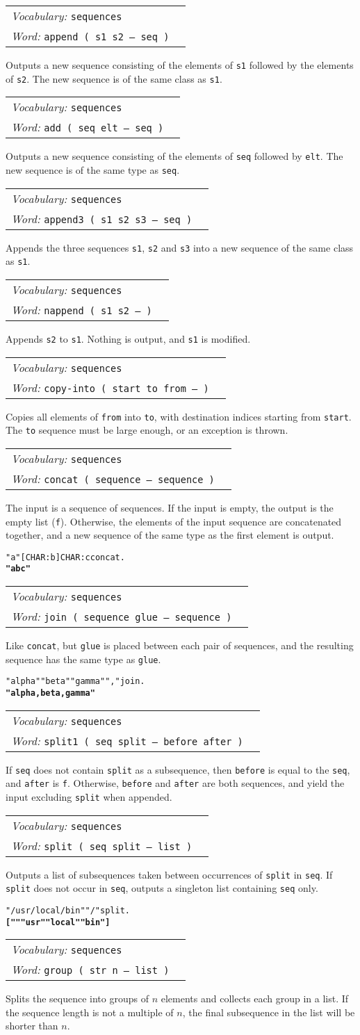 \documentclass{book}
\newcommand{\tto}{\symbol{123}}
\newcommand{\ttc}{\symbol{125}}
\newcommand{\vocabulary}[1]{\emph{Vocabulary:} \texttt{#1}&\\}
\newcommand{\ordinaryword}[2]{\index{\texttt{#1}}\emph{Word:} \texttt{#2}&\\}
\newcommand{\wordtable}[1]{


\begin{tabularx}{12cm}{lX}
\hline
#1
\hline
\end{tabularx}

}
\begin{document}
\wordtable{
\vocabulary{sequences}
\ordinaryword{append}{append ( s1 s2 -- seq )}
}
Outputs a new sequence consisting of the elements of \texttt{s1} followed by the elements of \texttt{s2}. The new sequence is of the same class as \texttt{s1}.
\wordtable{
\vocabulary{sequences}
\ordinaryword{add}{add ( seq elt -- seq )}
}
Outputs a new sequence consisting of the elements of \texttt{seq} followed by \verb|elt|.
The new sequence is of the same type as \texttt{seq}.
\wordtable{
\vocabulary{sequences}
\ordinaryword{append3}{append3 ( s1 s2 s3 -- seq )}
}
Appends the three sequences \texttt{s1}, \texttt{s2} and \texttt{s3} into a new sequence of the same class as \texttt{s1}.

\wordtable{
\vocabulary{sequences}
\ordinaryword{nappend}{nappend ( s1 s2 -- )}
}
Appends \texttt{s2} to \texttt{s1}. Nothing is output, and \texttt{s1} is modified.

\wordtable{
\vocabulary{sequences}
\ordinaryword{copy-into}{copy-into ( start to from -- )}
}
Copies all elements of \verb|from| into \verb|to|, with destination indices starting from \verb|start|. The \verb|to| sequence must be large enough, or an exception is thrown.

\wordtable{
\vocabulary{sequences}
\ordinaryword{concat}{concat ( sequence -- sequence )}
}
The input is a sequence of sequences. If the input is empty, the output is the empty list (\texttt{f}). Otherwise, the elements of the input sequence are concatenated together, and a new sequence of the same type as the first element is output.
\begin{alltt}
  \tto "a" [ CHAR: b ] \tto CHAR: c \ttc \ttc concat .
\textbf{"abc"}
\end{alltt}
\wordtable{
\vocabulary{sequences}
\ordinaryword{join}{join ( sequence glue -- sequence )}
}
Like \verb|concat|, but \verb|glue| is placed between each pair of sequences, and the resulting sequence has the same type as \verb|glue|.
\begin{alltt}
  \tto "alpha" "beta" "gamma" \ttc ", " join .
\textbf{"alpha, beta, gamma"}
\end{alltt}
\wordtable{
\vocabulary{sequences}
\ordinaryword{split1}{split1~( seq split -- before after )}
}
If \texttt{seq} does not contain \texttt{split} as a subsequence, then \texttt{before} is equal to the \texttt{seq}, and \texttt{after} is \texttt{f}. Otherwise, \texttt{before} and \texttt{after} are both sequences, and yield the input excluding \texttt{split} when appended.
\wordtable{
\vocabulary{sequences}
\ordinaryword{split}{split~( seq split -- list )}
}
Outputs a list of subsequences taken between occurrences of \texttt{split} in \texttt{seq}. If \texttt{split} does not occur in \texttt{seq}, outputs a singleton list containing \texttt{seq} only.
\begin{alltt}
  "/usr/local/bin" "/" split .
\textbf{[ "" "usr" "local" "bin" ]}
\end{alltt}
\wordtable{
\vocabulary{sequences}
\ordinaryword{group}{group~( str n -- list )}
}
Splits the sequence into groups of $n$ elements and collects each group in a list. If the sequence length is not a multiple of $n$, the final subsequence in the list will be shorter than $n$.
\end{document}
